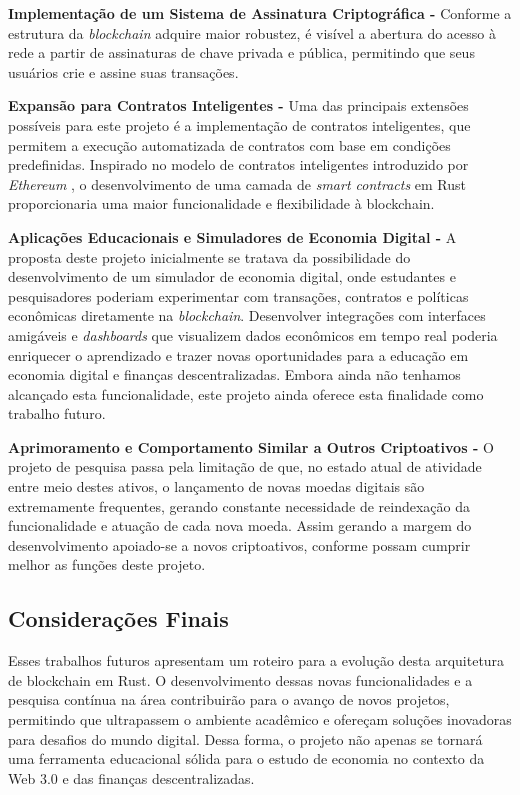 \documentclass[article,12pt,oneside,a4paper,english,brazil]{unifil}
\begin{document}
\begin{Spacing}{1.5}
\textbf{Implementação de um Sistema de Assinatura Criptográfica - }Conforme a estrutura da \textit{blockchain} adquire maior robustez, é visível a abertura do acesso à rede a partir de assinaturas de chave privada e pública, permitindo que seus usuários crie e assine suas transações. 

\textbf{Expansão para Contratos Inteligentes - }Uma das principais extensões possíveis para este projeto é a implementação de contratos inteligentes, que permitem a execução automatizada de contratos com base em condições predefinidas. Inspirado no modelo de contratos inteligentes introduzido por \textit{Ethereum} \cite{buterin2013ethereum}, o desenvolvimento de uma camada de \textit{smart contracts} em Rust proporcionaria uma maior funcionalidade e flexibilidade à blockchain. 

\textbf{Aplicações Educacionais e Simuladores de Economia Digital - }A proposta deste projeto inicialmente se tratava da possibilidade do desenvolvimento de um simulador de economia digital, onde estudantes e pesquisadores poderiam experimentar com transações, contratos e políticas econômicas diretamente na \textit{blockchain}. Desenvolver integrações com interfaces amigáveis e \textit{dashboards} que visualizem dados econômicos em tempo real poderia enriquecer o aprendizado e trazer novas oportunidades para a educação em economia digital e finanças descentralizadas. Embora ainda não tenhamos alcançado esta funcionalidade, este projeto ainda oferece esta finalidade como trabalho futuro.

\textbf{Aprimoramento e Comportamento Similar a Outros Criptoativos - }O projeto de pesquisa passa pela limitação de que, no estado atual de atividade entre meio destes ativos, o lançamento de novas moedas digitais são extremamente frequentes, gerando constante necessidade de reindexação da funcionalidade e atuação de cada nova moeda. Assim gerando a margem do desenvolvimento apoiado-se a novos criptoativos, conforme possam cumprir melhor as funções deste projeto.

\subsection*{Considerações Finais}
Esses trabalhos futuros apresentam um roteiro para a evolução desta arquitetura de blockchain em Rust. O desenvolvimento dessas novas funcionalidades e a pesquisa contínua na área contribuirão para o avanço de novos projetos, permitindo que ultrapassem o ambiente acadêmico e ofereçam soluções inovadoras para desafios do mundo digital. Dessa forma, o projeto não apenas se tornará uma ferramenta educacional sólida para o estudo de economia no contexto da Web 3.0 e das finanças descentralizadas.


\end{Spacing}
\end{document}
